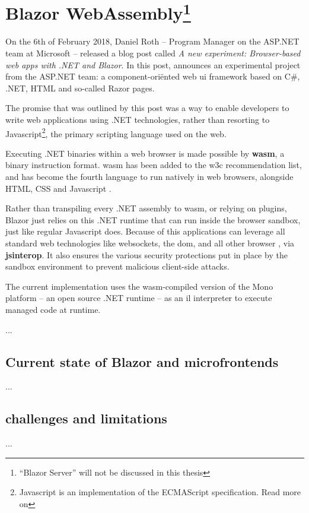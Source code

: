 \section[Blazor WebAssembly]{Blazor WebAssembly\footnote{``Blazor Server'' will
not be discussed in this thesis}}

On the 6th of February 2018, Daniel Roth -- Program Manager on the ASP.NET team
at Microsoft -- released a blog post called \textit{A new experiment:
Browser-based web apps with .NET and Blazor}. In this post, \textcite{Roth_2018}
announces an experimental project from the ASP.NET team: a component-ori\"ented
web \gls{ui} framework based on C\#, .NET, HTML and so-called Razor pages. 

The promise that was outlined by this post was a way to enable developers to
write web applications using .NET technologies, rather than resorting to
Javascript\footnote{Javascript is an implementation of the ECMAScript
specification. Read more on }, the
primary scripting language used on the web.

Executing .NET binaries within a web browser is made possible by
\textbf{\gls{wasm}}, a binary instruction format.
\Gls{wasm} has been added to the \gls{w3c} recommendation list, and has become
the fourth language to run natively in web browsers, alongside HTML, CSS and
Javascript \autocite{Couriol_2019}. 

Rather than \gls{transpiling} every .NET assembly to \gls{wasm}, or relying on
plugins, Blazor just relies on this .NET runtime that can run inside the browser
sandbox, just like regular Javascript does. Because of this applications can
leverage all standard web technologies like websockets, the \gls{dom}, and all
other browser , via \textbf{\gls{jsinterop}}. It also ensures the
various security protections put in place by the sandbox environment to prevent
malicious client-side attacks.

The current implementation uses the \gls{wasm}-compiled version of the
Mono platform -- an open source .NET
runtime -- as an \gls{il} interpreter to execute managed code at runtime.



...


\subsection{Current state of Blazor and microfrontends}
...

\subsection{challenges and limitations}
...